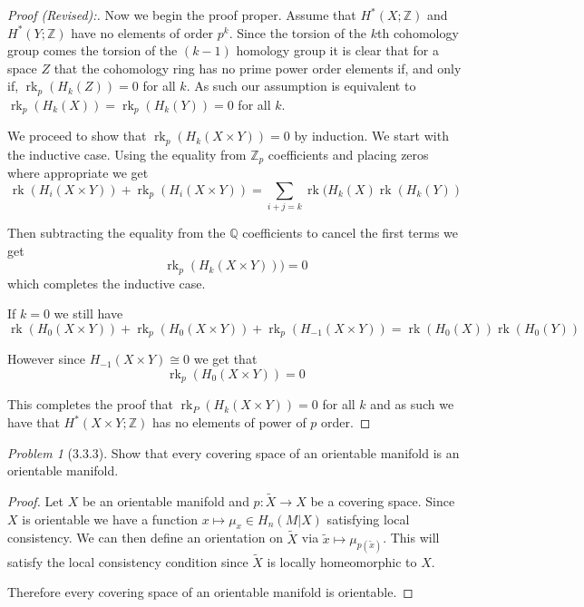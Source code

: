 \documentclass[10pt]{article}
\newcommand{\sk}{\vskip 10mm}
\newcommand{\bb}[1]{\mathbb{#1}}
\newcommand{\wt}[1]{\widetilde{#1}}
\DeclareMathOperator{\rk}{rk}
\theoremstyle{remark}
\newtheorem{problem}{Problem}
\begin{document}
\begin{proof}[Proof (Revised):]
  Now we begin the proof proper. Assume that $H^*(X;\bb{Z})$ and $H^*(Y;\bb{Z})$
  have no elements of order $p^k$. Since the torsion of the $k$th cohomology
  group comes the torsion of the $(k-1)$ homology group it is clear that for
  a space $Z$ that the cohomology ring has no prime power order elements if,
  and only if, $\rk_p(H_k(Z))=0$ for all $k$. As such our assumption is equivalent
  to $\rk_p(H_k(X))=\rk_p(H_k(Y))=0$ for all $k$.

  We proceed to show that $\rk_p(H_k(X\times Y))=0$ by induction. We start with the
  inductive case. Using the equality from $\bb{Z}_p$ coefficients and placing
  zeros where appropriate we get
  \[
    \rk(H_i(X\times Y))+\rk_p(H_i(X\times Y)) = \sum_{i+j=k}\rk(H_k(X)\rk(H_k(Y))
  \]
  
  Then subtracting the equality from the $\bb{Q}$ coefficients to cancel the first
  terms we get
  \[
    \rk_p(H_k(X\times Y))) = 0
  \]
  which completes the inductive case.

  If $k=0$ we still have
  \[
    \rk(H_0(X\times Y))+\rk_p(H_0(X\times Y))+\rk_p(H_{-1}(X\times Y)) = \rk(H_0(X))\rk(H_0(Y))
  \]
  
  However since $H_{-1}(X\times Y)\cong 0$ we get that
  \[
    \rk_p(H_0(X\times Y))=0
  \]

  This completes the proof that $\rk_P(H_k(X\times Y))=0$ for all $k$ and
  as such we have that $H^*(X\times Y;\bb{Z})$ has no elements of power of $p$
  order.
\end{proof}

\sk

\begin{problem}[3.3.3]
  Show that every covering space of an orientable manifold is an orientable
  manifold.
\end{problem} 

\begin{proof}
  Let $X$ be an orientable manifold and $p:\wt{X}\rightarrow X$ be a covering space.
  Since $X$ is orientable we have a function $x\mapsto \mu_x\in H_n(M|X)$ satisfying
  local consistency. We can then define an orientation on $\wt{X}$ via
  $\wt{x}\mapsto \mu_{p(\wt{x})}$. This will satisfy the local consistency condition
  since $\wt{X}$ is locally homeomorphic to $X$.

  Therefore every covering space of an orientable manifold is orientable.
\end{proof}
\end{document}

